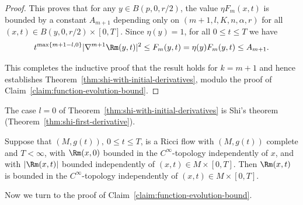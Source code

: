 \begin{proof}
This proves that for any $y\in B(p,0,r/2)$, the value
 $\eta F_m(x,t)$ is bounded by a
constant $A_{m+1}$ depending only on $(m+1,l,K,n,\alpha,r)$ for all
$(x,t)\in B(y,0,r/2)\times [0,T]$. Since $\eta(y)=1$, for all $0\le t\le T$ we have
$$t^{\max\{m+1-l,0\}}|\nabla^{m+1}\Rm(y,t)|^2\le F_m(y,t)=\eta(y)F_m(y,t)\le A_{m+1}.$$



This completes the inductive proof that the result holds for
$k=m+1$ and hence establishes Theorem~\ref{thm:shi-with-initial-derivatives}, modulo the proof of Claim~\ref{claim:function-evolution-bound}.
\end{proof}

\begin{remark}\label{rem:shi-derivative-variant}

The case $l=0$ of Theorem~\ref{thm:shi-with-initial-derivatives} is Shi's theorem
(Theorem~\ref{thm:shi-first-derivative}).
\end{remark}

\begin{corollary}\label{cor:ricci-flow-curvature-bounds}
\label{Cinftybd}

Suppose that $(M,g(t)),\ 0\le t\le T$, is a Ricci flow
with $(M,g(t))$ complete and $T<\infty$, with $\Rm(x,0)$ bounded in
the $C^\infty$-topology independently of $x$, and with $|\Rm(x,t)|$ bounded
independently of $(x,t)\in M\times[0,T]$. Then $\Rm(x,t)$ is bounded in the
$C^\infty$-topology independently of $(x,t)\in M\times[0,T]$.
\end{corollary}




Now we turn to the proof of Claim~\ref{claim:function-evolution-bound}.

